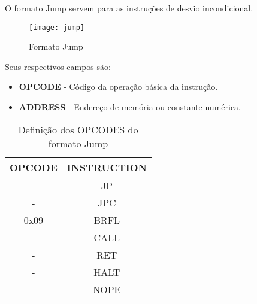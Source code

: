  O formato Jump servem para as instruções de desvio incondicional.  	
   	\begin{figure}[H]
    	\centering
    	\texttt{[image: jump]}
    	\caption{Formato Jump}
		\label{jump}
  	\end{figure}
Seus respectivos campos são:
	\begin{itemize}
	\item \textbf{OPCODE} - Código da operação básica da instrução.
	\item \textbf{ADDRESS} - Endereço de memória ou constante numérica.
\end{itemize}
 
\begin{table}[H]
\centering 	
  	\begin{tabular}{|c|c|}
  	\hline 
  	\cellcolor[gray]{0.9}\textbf{OPCODE} & \cellcolor[gray]{0.9}\textbf{INSTRUCTION} \\ 
  	\hline 
  	- & JP \\ 
  	\hline 
  	- & JPC \\ 
  	\hline 
  	0x09 & BRFL \\ 
  	\hline 
  	- & CALL \\ 
  	\hline 
  	- & RET \\ 
  	\hline 
  	- & HALT \\ 
  	\hline 
  	- & NOPE \\ 
  	\hline 
  	\end{tabular} 
  	  	\caption{Definição dos OPCODES do formato Jump}
\end{table}